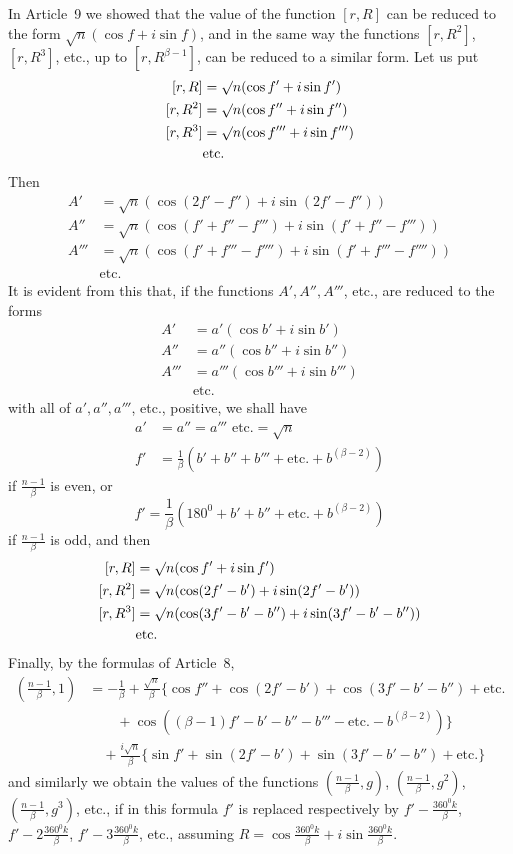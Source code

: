 In Article~9 we showed that the value of the function $[r,R]$ can be reduced to the form $\surd n(\cos f+i\sin f)$, and in the same way the functions $[r,R^2]$, $[r,R^3]$, etc., up to $[r,R^{\beta-1}]$, can be reduced to a similar form. Let us put
\[
\begin{aligned}
\relax[r,R]&=\surd n(\cos f'+i\sin f')\\
\relax[r,R^2]&=\surd n(\cos f''+i\sin f'')\\
\relax[r,R^3]&=\surd n(\cos f'''+i\sin f''')\\
&\text{etc.}
\end{aligned}
\]
Then
\[
\begin{aligned}
A'&=\surd n(\cos(2f'-f'')+i\sin(2f'-f''))\\
A''&=\surd n(\cos(f'+f''-f''')+i\sin(f'+f''-f'''))\\
A'''&=\surd n(\cos(f'+f'''-f'''')+i\sin(f'+f'''-f''''))\\
&\text{etc.}
\end{aligned}
\]
It is evident from this that, if the functions $A',A'',A'''$, etc., are reduced to the forms
\[
\begin{aligned}
A'&=a'(\cos b'+i\sin b')\\
A''&=a''(\cos b''+i\sin b'')\\
A'''&=a'''(\cos b'''+i\sin b''')\\
&\text{etc.}
\end{aligned}
\]
with all of $a',a'',a'''$, etc., positive, we shall have
\[
\begin{aligned}
a'&=a''=a'''\text{ etc.}=\surd n\\
f'&=\frac1\beta(b'+b''+b'''+\text{etc.}+b^{(\beta-2)})
\end{aligned}
\]
if $\frac{n-1}\beta$ is even, or
\[
f'=\frac1\beta(180^0+b'+b''+\text{etc.}+b^{(\beta-2)})
\]
if $\frac{n-1}\beta$ is odd, and then
\[
\begin{aligned}
\relax[r,R]&=\surd n(\cos f'+i\sin f')\\
\relax[r,R^2]&=\surd n(\cos(2f'-b')+i\sin(2f'-b'))\\
\relax[r,R^3]&=\surd n(\cos(3f'-b'-b'')+i\sin(3f'-b'-b''))\\
&\text{etc.}
\end{aligned}
\]
Finally, by the formulas of Article~8,
\[
\begin{aligned}
\left(\frac{n-1}\beta,1\right)&=-\frac1\beta+\frac{\surd n}\beta\{\cos f''+\cos(2f'-b')+\cos(3f'-b'-b'')+\text{etc.}\\
&\qquad+\cos((\beta-1)f'-b'-b''-b'''-\text{etc.}-b^{(\beta-2)})\}\\
&\quad+\frac{i\surd n}\beta\{\sin f'+\sin(2f'-b')+\sin(3f'-b'-b'')+\text{etc.}\}
\end{aligned}
\]
and similarly we obtain the values of the functions $\left(\frac{n-1}\beta,g\right)$, $\left(\frac{n-1}\beta,g^2\right)$, $\left(\frac{n-1}\beta,g^3\right)$, etc., if in this formula $f'$ is replaced respectively by $f'-\frac{360^0k}\beta$, $f'-2\frac{360^0k}\beta$, $f'-3\frac{360^0k}\beta$, etc., assuming $R=\cos\frac{360^0k}\beta+i\sin\frac{360^0k}\beta$.

